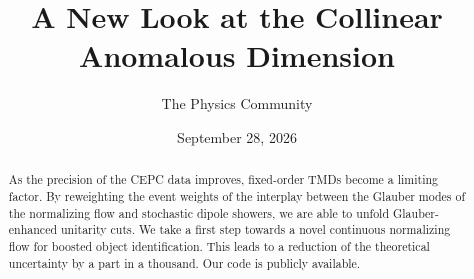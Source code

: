 \documentclass[11pt]{article}
\title{A New Look at the Collinear Anomalous Dimension}
\author{The Physics Community}
\date{September 28, 2026}
\numberwithin{equation}{section}
\theoremstyle{definition}
\theoremstyle{remark}
\begin{document}
\maketitle
\begin{abstract}
As the precision of the CEPC data improves, fixed-order TMDs become a
limiting factor. By reweighting the event weights of the interplay
between the Glauber modes of the normalizing flow and stochastic dipole
showers, we are able to unfold Glauber-enhanced unitarity cuts. We take
a first step towards a novel continuous normalizing flow for boosted
object identification. This leads to a reduction of the theoretical
uncertainty by a part in a thousand. Our code is publicly available.
\end{abstract}
\tableofcontents




\nocite{*}


\end{document}

